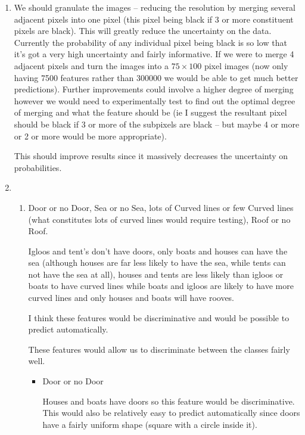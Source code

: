 \documentclass[10pt, a4paper]{article}
\begin{document}
\begin{enumerate}[label=(\alph*)]
\item We should granulate the images -- reducing the resolution by merging several adjacent pixels into one 
pixel (this pixel being black if 3 or more constituent pixels are black). This will greatly reduce the uncertainty on the data. Currently the probability of any individual pixel 
being black is so low that it's got a very high uncertainty and fairly informative. If we were to merge 
4 adjacent pixels and turn the images into a $75 \times 100$ pixel images (now only having 7500 features rather 
than 300000 we would be able to get much better predictions). Further improvements could involve a higher degree 
of merging however we would need to experimentally test to find out the optimal degree of merging and what the feature should be 
(ie I suggest the resultant pixel should be black if 3 or more of the subpixels are black -- but maybe 4 or more or 2 or more would be more appropriate).

This should improve results since it massively decreases the uncertainty on probabilities.

\item 

\begin{enumerate}

\item Door or no Door, Sea or no Sea, lots of Curved lines or few Curved lines (what constitutes lots of curved 
lines would require testing), Roof or no Roof. 

Igloos and tent's don't have doors, only boats and houses can have the sea (although houses are far less 
likely to have the sea, while tents can not have the sea at all), houses and tents are less likely than 
igloos or boats to have curved lines while boats and igloos are 
likely to have more curved lines and only houses and boats will have rooves.

I think these features would be discriminative and would be possible to predict automatically.

These features would allow us to discriminate between the classes fairly well.

\begin{itemize}

\item Door or no Door

Houses and boats have doors so this feature would be discriminative. This would also be relatively easy 
to predict automatically since doors have a fairly uniform shape (square with a circle inside it).


\end{itemize}
\end{enumerate}
\end{enumerate}
\end{document}
